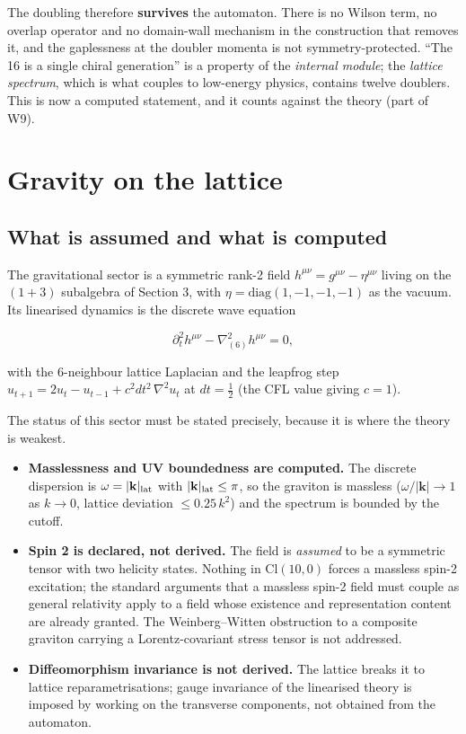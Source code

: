 \documentclass[aps,prd,twocolumn,amsmath,amssymb,superscriptaddress,nofootinbib,floatfix]{revtex4-2}
\providecommand{\tightlist}{\setlength{\itemsep}{0pt}\setlength{\parskip}{0pt}}
\begin{document}
The doubling therefore \textbf{survives} the automaton. There is no
Wilson term, no overlap operator \cite{ref48} and no domain-wall
mechanism in the construction that removes it, and the gaplessness at
the doubler momenta is not symmetry-protected. ``The 16 is a single
chiral generation'' is a property of the \emph{internal module}; the
\emph{lattice spectrum}, which is what couples to low-energy physics,
contains twelve doublers. This is now a computed statement, and it
counts against the theory (part of W9).

\section{Gravity on the lattice}\label{gravity-on-the-lattice}

\subsection{What is assumed and what is
computed}\label{what-is-assumed-and-what-is-computed}

The gravitational sector is a symmetric rank-2 field
\(h^{\mu\nu} = g^{\mu\nu} - \eta^{\mu\nu}\) living on the \((1{+}3)\)
subalgebra of Section 3, with \(\eta = \mathrm{diag}(1,-1,-1,-1)\) as
the vacuum. Its linearised dynamics is the discrete wave equation

\[\partial_t^2 h^{\mu\nu} - \nabla^2_{(6)} h^{\mu\nu} = 0,\]

with the 6-neighbour lattice Laplacian and the leapfrog step
\(u_{t+1} = 2u_t - u_{t-1} + c^2 dt^2\,\nabla^2 u_t\) at
\(dt = \tfrac12\) (the CFL value giving \(c = 1\)).

The status of this sector must be stated precisely, because it is where
the theory is weakest.

\begin{itemize}
\tightlist
\item
  \textbf{Masslessness and UV boundedness are computed.} The discrete
  dispersion is \(\omega = |\mathbf{k}|_{\rm lat}\) with
  \(|\mathbf{k}|_{\rm lat} \le \pi\), so the graviton is massless
  (\(\omega/|\mathbf{k}| \to 1\) as \(k \to 0\), lattice deviation
  \(\le 0.25\,k^2\)) and the spectrum is bounded by the cutoff.
\item
  \textbf{Spin 2 is declared, not derived.} The field is \emph{assumed}
  to be a symmetric tensor with two helicity states. Nothing in
  \(\mathrm{Cl}(10,0)\) forces a massless spin-2 excitation; the
  standard arguments that a massless spin-2 field must couple as general
  relativity \cite{ref20} apply to a field whose existence and
  representation content are already granted. The Weinberg--Witten
  obstruction to a composite graviton carrying a Lorentz-covariant
  stress tensor \cite{ref21} is not addressed.
\item
  \textbf{Diffeomorphism invariance is not derived.} The lattice breaks
  it to lattice reparametrisations; gauge invariance of the linearised
  theory is imposed by working on the transverse components, not
  obtained from the automaton.
\end{itemize}
\end{document}
